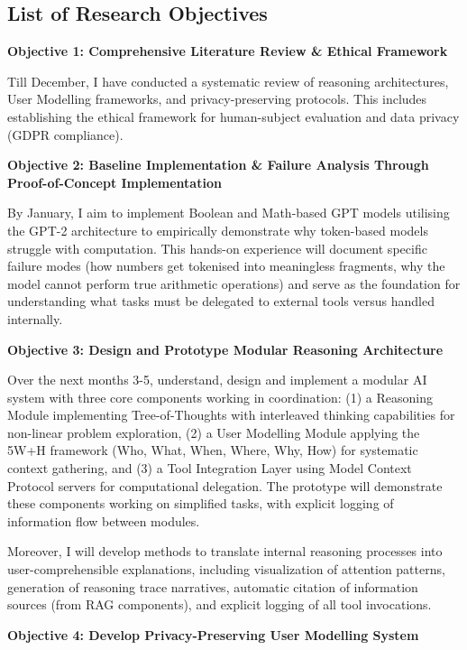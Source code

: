 \documentclass[a4paper,oneside,12pt]{book}
\numberwithin{equation}{chapter} %
\begin{document}
\subsection{List of Research Objectives}
\textbf{Objective 1: Comprehensive Literature Review \& Ethical Framework} 

Till December, I have conducted a systematic review of reasoning architectures, User Modelling frameworks, and privacy-preserving protocols. This includes establishing the ethical framework for human-subject evaluation and data privacy (GDPR compliance).

\textbf{Objective 2: Baseline Implementation \& Failure Analysis Through Proof-of-Concept Implementation}

By January, I aim to implement Boolean and Math-based GPT models utilising the GPT-2 architecture to empirically demonstrate why token-based models struggle with computation. This hands-on experience will document specific failure modes (how numbers get tokenised into meaningless fragments, why the model cannot perform true arithmetic operations) and serve as the foundation for understanding what tasks must be delegated to external tools versus handled internally.

\textbf{Objective 3: Design and Prototype Modular Reasoning Architecture}

Over the next months 3-5, understand, design and implement a modular AI system with three core components working in coordination: (1) a Reasoning Module implementing Tree-of-Thoughts with interleaved thinking capabilities for non-linear problem exploration, (2) a User Modelling Module applying the 5W+H framework (Who, What, When, Where, Why, How) for systematic context gathering, and (3) a Tool Integration Layer using Model Context Protocol servers for computational delegation. The prototype will demonstrate these components working on simplified tasks, with explicit logging of information flow between modules.

Moreover, I will develop methods to translate internal reasoning processes into user-comprehensible explanations, including visualization of attention patterns, generation of reasoning trace narratives, automatic citation of information sources (from RAG components), and explicit logging of all tool invocations. 

\textbf{Objective 4: Develop Privacy-Preserving User Modelling System}
\end{document}
